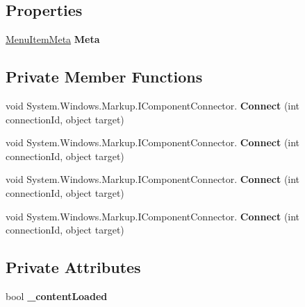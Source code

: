 \subsection*{Properties}
\begin{DoxyCompactItemize}
\item 
\mbox{\hyperlink{class_wpf_handler_1_1_plugins_1_1_menu_item_meta}{Menu\+Item\+Meta}} {\bfseries Meta}
\end{DoxyCompactItemize}
\subsection*{Private Member Functions}
\begin{DoxyCompactItemize}
\item 
\mbox{\label{class_example_plugin1_1_1_sub_plugin1_control_a0eac9906038b8da2d7c01406a90e88b2}} 
void System.\+Windows.\+Markup.\+I\+Component\+Connector. {\bfseries Connect} (int connection\+Id, object target)
\item 
\mbox{\label{class_example_plugin1_1_1_sub_plugin1_control_a0eac9906038b8da2d7c01406a90e88b2}} 
void System.\+Windows.\+Markup.\+I\+Component\+Connector. {\bfseries Connect} (int connection\+Id, object target)
\item 
\mbox{\label{class_example_plugin1_1_1_sub_plugin1_control_a0eac9906038b8da2d7c01406a90e88b2}} 
void System.\+Windows.\+Markup.\+I\+Component\+Connector. {\bfseries Connect} (int connection\+Id, object target)
\item 
\mbox{\label{class_example_plugin1_1_1_sub_plugin1_control_a0eac9906038b8da2d7c01406a90e88b2}} 
void System.\+Windows.\+Markup.\+I\+Component\+Connector. {\bfseries Connect} (int connection\+Id, object target)
\end{DoxyCompactItemize}
\subsection*{Private Attributes}
\begin{DoxyCompactItemize}
\item 
\mbox{\label{class_example_plugin1_1_1_sub_plugin1_control_a3e9435a0c2f5149bd1112dc89fb1fa06}} 
bool {\bfseries \+\_\+content\+Loaded}
\end{DoxyCompactItemize}


